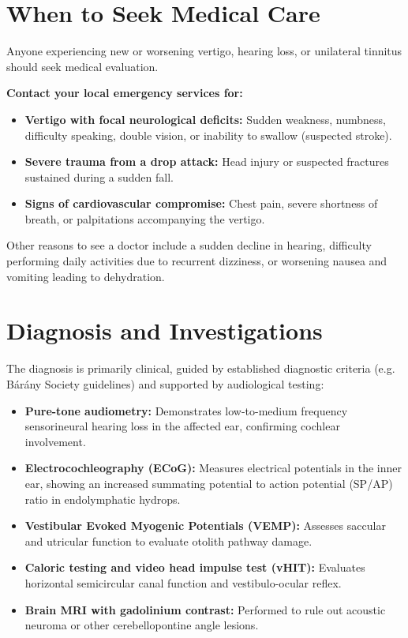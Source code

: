 \section*{When to Seek Medical Care}
Anyone experiencing new or worsening vertigo, hearing loss, or unilateral tinnitus should seek medical evaluation.

\textbf{Contact your local emergency services for:}
\begin{itemize}
    \item \textbf{Vertigo with focal neurological deficits:} Sudden weakness, numbness, difficulty speaking, double vision, or inability to swallow (suspected stroke).
    \item \textbf{Severe trauma from a drop attack:} Head injury or suspected fractures sustained during a sudden fall.
    \item \textbf{Signs of cardiovascular compromise:} Chest pain, severe shortness of breath, or palpitations accompanying the vertigo.
\end{itemize}
Other reasons to see a doctor include a sudden decline in hearing, difficulty performing daily activities due to recurrent dizziness, or worsening nausea and vomiting leading to dehydration.

\section*{Diagnosis and Investigations}
The diagnosis is primarily clinical, guided by established diagnostic criteria (e.g. Bárány Society guidelines) and supported by audiological testing:
\begin{itemize}
    \item \textbf{Pure-tone audiometry:} Demonstrates low-to-medium frequency sensorineural hearing loss in the affected ear, confirming cochlear involvement.
    \item \textbf{Electrocochleography (ECoG):} Measures electrical potentials in the inner ear, showing an increased summating potential to action potential (SP/AP) ratio in endolymphatic hydrops.
    \item \textbf{Vestibular Evoked Myogenic Potentials (VEMP):} Assesses saccular and utricular function to evaluate otolith pathway damage.
    \item \textbf{Caloric testing and video head impulse test (vHIT):} Evaluates horizontal semicircular canal function and vestibulo-ocular reflex.
    \item \textbf{Brain MRI with gadolinium contrast:} Performed to rule out acoustic neuroma or other cerebellopontine angle lesions.
\end{itemize}

